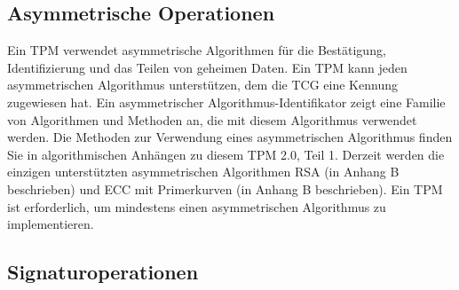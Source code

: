 \subsection{Asymmetrische Operationen}

Ein TPM verwendet asymmetrische Algorithmen für die Bestätigung, Identifizierung und das Teilen von geheimen Daten. Ein TPM kann jeden asymmetrischen Algorithmus unterstützen, dem die TCG eine Kennung zugewiesen hat. Ein asymmetrischer Algorithmus-Identifikator zeigt eine Familie von Algorithmen und Methoden an, die mit diesem Algorithmus verwendet werden.
Die Methoden zur Verwendung eines asymmetrischen Algorithmus finden Sie in algorithmischen Anhängen zu diesem TPM 2.0, Teil 1. Derzeit werden die einzigen unterstützten asymmetrischen Algorithmen RSA (in Anhang B beschrieben) und ECC mit Primerkurven (in Anhang B beschrieben).
Ein TPM ist erforderlich, um mindestens einen asymmetrischen Algorithmus zu implementieren.

\subsection{Signaturoperationen}
